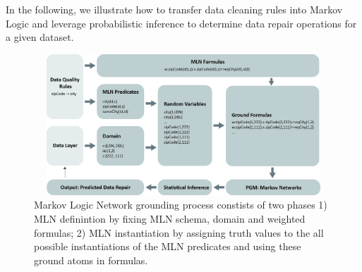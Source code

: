 In the following, we illustrate how to transfer data cleaning rules into Markov Logic and leverage probabilistic inference to determine data repair operations for a given dataset. 




\begin{figure}[t]
 \centering
 \includegraphics[width=450px, height=200px]{img/mlogic-grounging.jpg}
 \caption{Markov Logic Network grounding process constists of two phases 1) MLN definintion by fixing MLN schema, domain and weighted formulas; 2) MLN instantiation by assigning truth values to the all possible instantiations of the MLN predicates and using these ground atoms in formulas.}
 \label{fig:mlngrounding}
\end{figure}

